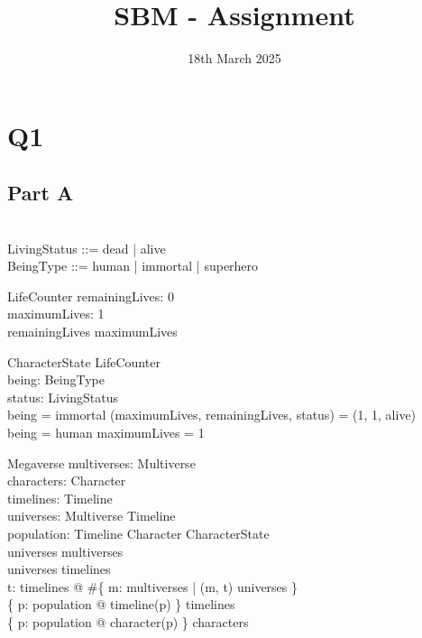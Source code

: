 \documentclass{article}
\title{SBM - Assignment}
\date{\vspace{-1.0cm}18th March 2025}
\begin{document}
\maketitle

\pagebreak 

\section*{Q1}

\subsection*{Part A}

\begin{zed}
 \\
LivingStatus ::= dead | alive \\
BeingType ::= human | immortal | superhero \\
\end{zed}

\begin{schema}{LifeCounter}
remainingLives: 0   \\ 
maximumLives: 1  \\ 
\where
remainingLives \leq maximumLives \\
\end{schema}

\begin{schema}{CharacterState}
LifeCounter \\ 
being: BeingType \\
status: LivingStatus \\
\where
being = immortal \implies (maximumLives, remainingLives, status) = (1, 1, alive) \\
being = human \implies maximumLives = 1 \\
\end{schema}

\begin{schema}{Megaverse}
multiverses: \power Multiverse \\
characters: \power Character \\
timelines: \power Timeline \\ 
universes: Multiverse \rel Timeline \\
population: Timeline \cross Character \pfun CharacterState \\
\where
\dom universes \subseteq multiverses \\ 
\ran universes \subseteq timelines \\ 
\forall t: timelines @ \#\{ m: multiverses | (m, t) \in universes \}  \\
\{ p: \dom population @ timeline(p) \} \subseteq timelines \\
\{ p: \dom population @ character(p) \} \subseteq characters \\
\end{schema}
\end{document}
